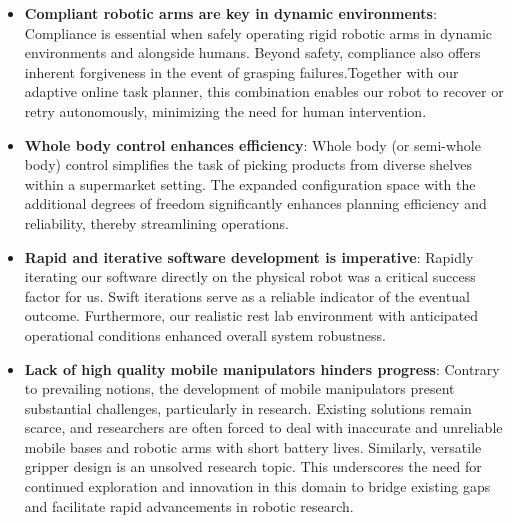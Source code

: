 \begin{itemize}
    \item \textbf{Compliant robotic arms are key in dynamic environments}:
    Compliance is essential when safely operating rigid robotic arms in dynamic environments and alongside humans. Beyond safety, compliance also offers inherent forgiveness in the event of grasping failures.Together with our adaptive online task planner, this combination enables our robot to recover or retry autonomously, minimizing the need for human intervention. 

    \item \textbf{Whole body control enhances efficiency}:
    Whole body (or semi-whole body) control simplifies the task of picking products from diverse shelves within a supermarket setting. The expanded configuration space with the additional degrees of freedom significantly enhances planning efficiency and reliability, thereby streamlining operations.

    \item \textbf{Rapid and iterative software development is imperative}:
    Rapidly iterating our software directly on the physical robot was a critical success factor for us. Swift iterations serve as a reliable indicator of the eventual outcome. Furthermore, our realistic rest lab environment with anticipated operational conditions enhanced overall system robustness.

    \item \textbf{Lack of high quality mobile manipulators hinders progress}:
    Contrary to prevailing notions, the development of mobile manipulators present substantial challenges, particularly in research. Existing solutions remain scarce, and researchers are often forced to deal with inaccurate and unreliable mobile bases and robotic arms with short battery lives. Similarly, versatile gripper design is an unsolved research topic. This underscores the need for continued exploration and innovation in this domain to bridge existing gaps and facilitate rapid advancements in robotic research.   
\end{itemize}